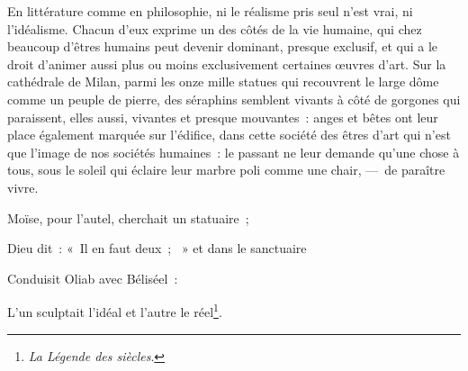 \documentclass[french,twoside]{book} %
\newenvironment{quoteblock}%
  {\begin{quoting}}
  {\end{quoting}}
\newenvironment{quotebar}{%
    \def\FrameCommand{{\color{rubric!10!}\vrule width 0.5em} \hspace{0.9em}}%
    \def\OuterFrameSep{\itemsep} %
    \MakeFramed {\advance\hsize-\width \FrameRestore}
  }%
  {%
    \endMakeFramed
  }
\renewenvironment{quoteblock}%
  {%
    \savenotes
    \setstretch{0.9}
    \normalfont
    \begin{quotebar}
  }
  {%
    \end{quotebar}
    \spewnotes
  }
\begin{document}
En littérature comme en philosophie, ni le réalisme pris seul n’est vrai, ni l’idéalisme. Chacun d’eux exprime un des côtés de la vie humaine, qui chez beaucoup d’êtres humains peut devenir dominant, presque exclusif, et qui a le droit d’animer aussi plus ou moins exclusivement certaines œuvres d’art. Sur la cathédrale de Milan, parmi les onze mille statues qui recouvrent le large dôme comme un peuple de pierre, des séraphins semblent vivants à côté de gorgones qui paraissent, elles aussi, vivantes et presque mouvantes : anges et bêtes ont leur place également marquée sur l’édifice, dans cette société des êtres d’art qui n’est que l’image de nos sociétés humaines : le passant ne leur demande qu’une chose à tous, sous le soleil qui éclaire leur marbre poli comme une chair, — de paraître vivre.\par

\begin{quoteblock}
 \noindent Moïse, pour l’autel, cherchait un statuaire ;\par
 Dieu dit : « Il en faut deux ;  » et dans le sanctuaire\par
 Conduisit Oliab avec Béliséel :\par
 L’un sculptait l’idéal et l’autre le réel\footnote{\emph{La Légende des siècles}.}.
 \end{quoteblock}
\end{document}
